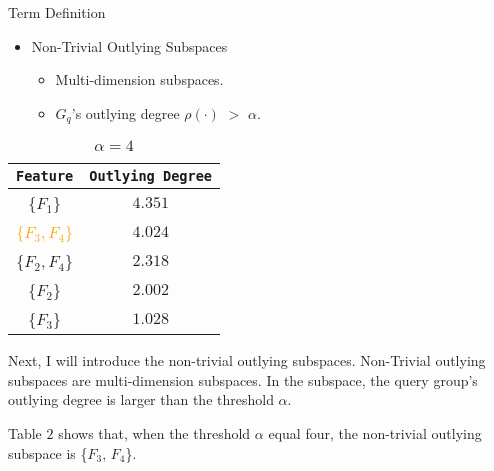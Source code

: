 \documentclass[
 size=14pt,
 paper=smartboard,  %
 mode=present, 		%
 display=slides, 	%
 style=tuliplab,  	%
 pauseslide,
 fleqn,leqno]{powerdot}
\begin{document}
\begin{slide}[toc=,bm=]{Term Definition}
\begin{itemize}
\item
Non-Trivial Outlying Subspaces
\begin{itemize}
\item
\smallskip
Multi-dimension subspaces.

\item
\smallskip
${G_q}$'s outlying degree $\rho(\cdot)$ $>$ $\alpha$.
\end{itemize}
\end{itemize}

\begin{table}
\setlength{\abovecaptionskip}{0pt}
\setlength{\belowcaptionskip}{10pt}
\centering
\caption{$\alpha = 4$}

\begin{tabular}{  c  |  c }
\toprule
\centering
\texttt{Feature}  & \texttt{Outlying Degree}  \\
\midrule
 {\{$F_1$\}}                           & $4.351$ \\
 {\textcolor{orange}{\{$F_3, F_4$\}}}  & $4.024$ \\
 {\{$F_2, F_4$\}}                      & $2.318$ \\
 {\{$F_2$\}}                           & $2.002$ \\
 {\{$F_3$\}}                           & $1.028$ \\
\bottomrule
\end{tabular}
\end{table}

\begin{note}
Next,
I will introduce the non-trivial outlying subspaces.
Non-Trivial outlying subspaces are multi-dimension subspaces.
In the subspace,
the query group's outlying degree is larger than the threshold $\alpha$.

Table $2$ shows that,
when the threshold $\alpha$ equal four,
the non-trivial outlying subspace is \{$F_3$, $F_4$\}.
\end{note}

\end{slide}
\end{document}

